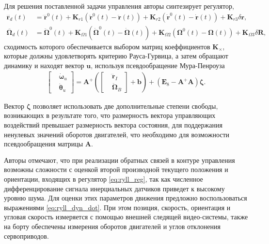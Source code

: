 Для решения поставленной задачи управления авторы синтезирует регулятор,
\begin{equation} \label{eq:ryll_reg}
\begin{aligned}
\dddot{\bm{r}_d}(t)&=
\dddot{\bm{r}}^0(t) +
\bm{K}_{r1}(\ddot{\bm{r}}^0(t) - \ddot{\bm{r}}(t)) +
\bm{K}_{r2}(\dot{\bm{r}}^0(t) - \dot{\bm{r}}(t)) + 
\bm{K}_{r3}\delta \bm r,
\\
\ddot{\bm{\Omega}_d}(t)&=
\ddot{\bm{\Omega}}^0(t)
+ \bm{K}_{\Omega1}(\dot{\bm{\Omega}}^0(t)-\dot{\bm{\Omega}}(t))
+ \bm{K}_{\Omega2}(\bm{\Omega}^0(t)-\bm{\Omega}(t))
+ \bm{K}_{\Omega3}\delta\bm{R},
\end{aligned}
\end{equation}
сходимость которого обеспечивается выбором матриц коеффициентов $\bm K_{\times}$, которые должны удовлетворять критерию Рауса-Гурвица, а затем обращают динамику и находят вектор $\bm u$, используя псевдообращение Мура-Пенроуза \cite{Barata01}
\begin{equation} \label{eq:ryll_inversed}
\begin{aligned}
\begin{bmatrix}
&\dot{\bm \omega}_u
\\
&\dot{\bm \theta}_u
\end{bmatrix}
=
\bm A^+ \left(
\begin{bmatrix}
&\dddot{\bm r}_I
\\
&\ddot{\bm \Omega}_B
\end{bmatrix}
+
\bm b
\right)
+
(\bm E_8 - \bm A^+ \bm A) \bm \zeta.
\end{aligned}
\end{equation}

Вектор $\bm \zeta$ позволяет использовать две дополнительные степени свободы, возникающих в результате того, что размерность вектора управляющих воздействий превышает размерность вектора состояния, для поддержания ненулевых значений оборотов двигателей, что необходимо для возможности псевдообращения матрицы $\bm A$.

Авторы отмечают, что при реализации обратных связей в контуре управления возможны сложности
с оценкой второй производной текущего положения и ориентации, входящих в регулятор \eqref{eq:ryll_reg},
так как численное дифференцирование сигнала инерциальных датчиков приведет к высокому уровню шума.
Для оценки этих параметров движения предложно воспользоваться выражениями \eqref{eq:ryll_dyn_dot}.
При этом позиция, скорость, ориентация и угловая скорость
измеряется с помощью внешней следящей видео-системы,
также на борту обеспечены измерения оборотов двигателей и углов отклонения сервоприводов.

